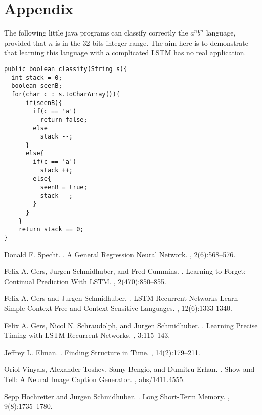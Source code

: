 \documentclass[11pt,letterpaper]{article}
\begin{document}
\section{Appendix}
The following little java programs can classify correctly the $a^nb^n$ language, provided that $n$ is in the 32 bits integer range. The aim here is to demonstrate that learning this language with a complicated LSTM has no real application.

\begin{verbatim}
public boolean classify(String s){
  int stack = 0;
  boolean seenB;
  for(char c : s.toCharArray()){
      if(seenB){
	    if(c == 'a')
          return false;
        else 
          stack --;		
      }
      else{
        if(c == 'a')
          stack ++;
        else{
          seenB = true;
          stack --;
        }
      }
    }
    return stack == 0;
}
\end{verbatim}


\begin{thebibliography}{}

Donald F. Specht.
.
\newblock A General Regression Neural Network.
,
2(6):568--576.

Felix A. Gers,  Jurgen Schmidhuber, and Fred Cummins.
.
\newblock Learning to Forget: Continual Prediction With LSTM.
,
2(470):850--855.

Felix A. Gers and Jurgen Schmidhuber.
.
\newblock LSTM Recurrent Networks Learn Simple Context-Free and Context-Sensitive Languages.
,
12(6):1333-1340.

Felix A. Gers, Nicol N. Schraudolph, and Jurgen Schmidhuber.
.
\newblock Learning Precise Timing with LSTM Recurrent Networks.
,
3:115--143.

Jeffrey L. Elman.
.
\newblock Finding Structure in Time.
,
14(2):179--211.

Oriol Vinyals, Alexander Toshev, Samy Bengio, and Dumitru Erhan.
.
\newblock Show and Tell: A Neural Image Caption Generator.
,
abs/1411.4555.

Sepp Hochreiter and Jurgen Schmidhuber.
.
\newblock Long Short-Term Memory.
,
9(8):1735--1780.

\end{thebibliography}
\end{document}
